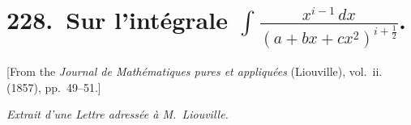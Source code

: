 \documentclass[11pt,a4paper]{book}
\theoremstyle{plain}
\begin{document}
\chapter[Sur l'int\'{e}grale $\int\frac{x^{i-1}\,dx}{(a+bx+cx^2)^{i+\frac{1}{2}}}$]{228.\ Sur l'int\'{e}grale $\displaystyle\int\frac{x^{i-1}\,dx}{(a+bx+cx^2)^{i+\frac{1}{2}}}$.}
\label{paper228}

\begin{center}
\small
[From the \textit{Journal de Math\'{e}matiques pures et appliqu\'{e}es} (Liouville), vol.~ii. (1857), pp.~49--51.]

\smallskip
\textit{Extrait d'une Lettre adress\'{e}e \`{a} M.~Liouville.}
\end{center}

\bigskip
\end{document}
